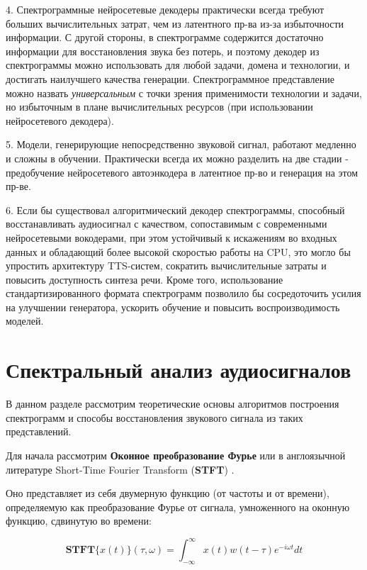 4. Спектрограммные нейросетевые декодеры практически всегда требуют больших вычислительных затрат, чем из латентного пр-ва из-за избыточности информации. 
С другой стороны, в спектрограмме содержится достаточно информации для восстановления звука без потерь, 
и поэтому декодер из спектрограммы можно использовать для любой задачи, домена и технологии, и достигать наилучшего качества генерации.
Спектрограммное представление можно назвать \textit{универсальным} с точки зрения применимости технологии и задачи, но избыточным в плане вычислительных ресурсов 
(при использовании нейросетевого декодера).

5. Модели, генерирующие непосредственно звуковой сигнал, работают медленно и сложны в обучении. Практически всегда их можно разделить на две стадии - предобучение нейросетевого автоэнкодера в латентное пр-во и генерация на этом пр-ве.

6. Если бы существовал алгоритмический декодер спектрограммы, способный восстанавливать аудиосигнал с качеством, 
сопоставимым с современными нейросетевыми вокодерами, при этом устойчивый к искажениям во входных данных и обладающий более высокой скоростью работы на CPU, 
это могло бы упростить архитектуру TTS-систем, сократить вычислительные затраты и повысить доступность синтеза речи. 
Кроме того, использование стандартизированного формата спектрограмм позволило бы сосредоточить усилия на улучшении генератора, 
ускорить обучение и повысить воспроизводимость моделей.


\section{Спектральный анализ аудиосигналов}
В данном разделе рассмотрим теоретические основы алгоритмов построения спектрограмм и способы восстановления звукового сигнала из таких представлений.

Для начала рассмотрим \textbf{Оконное преобразование Фурье} или в англоязычной литературе Short-Time Fourier Transform (\textbf{STFT}) \cite{STFT}.

Оно представляет из себя двумерную функцию (от частоты и от времени), определяемую как преобразование Фурье от сигнала, умноженного на оконную функцию, сдвинутую во времени:

\begin{equation}
  \textbf{STFT}\{x(t)\} (\tau, \omega) = \int_{-\infty}^\infty x(t) w(t - \tau) e^{-i\omega t} dt
  \label{eq:stft_cont}
\end{equation}

